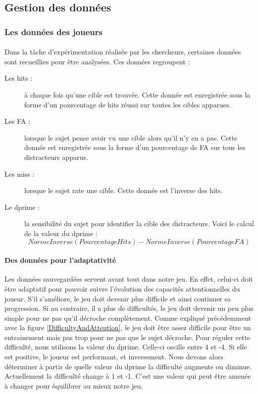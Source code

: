 \subsection{Gestion des données}
\label{Donnees}

\subsubsection{Les données des joueurs}

\paragraph{}Dans la tâche d'expérimentation réalisée par les chercheurs, certaines données sont recueillies pour être analysées. Ces données regroupent :
\begin{description}
\item[Les hits :] à chaque fois qu'une cible est trouvée. Cette donnée est enregistrée sous la forme d'un pourcentage de hits réussi sur toutes les cibles apparues.
\item[Les FA :] lorsque le sujet pense avoir vu une cible alors qu'il n'y en a pas. Cette donnée est enregistrée sous la forme d'un pourcentage de FA sur tous les distracteurs apparus.
\item[Les miss :] lorsque le sujet rate une cible. Cette donnée est l'inverse des hits.
\item[Le dprime :] la sensibilité du sujet pour identifier la cible des distracteurs. Voici le calcul de la valeur du dprime : \[NormeInverse(PourcentageHits) - NormeInverse(PourcentageFA)\]
\end{description}

\paragraph{Des données pour l'adaptativité}Les données sauvegardées servent avant tout dans notre jeu. En effet, celui-ci doit être adaptatif pour pouvoir suivre l'évolution des
capacités attentionnelles du joueur. S'il s'améliore, le jeu doit devenir plus difficile et ainsi continuer sa progression. Si au contraire, il a plus de difficultés, le jeu doit
devenir un peu plus simple pour ne pas qu'il décroche complètement. Comme expliqué précédemment avec la figure \ref{DifficultyAndAttention}, le jeu doit être assez difficile pour être
un entrainement mais pas trop pour ne pas que le sujet décroche. Pour réguler cette difficulté, nous utilisons la valeur du dprime. Celle-ci oscille entre 4 et -4. Si elle est positive,
le joueur est performant, et inversement. Nous devons alors déterminer à partir de quelle valeur du dprime la difficulté augmente ou diminue. Actuellement la difficulté change à 1 et
-1. C'est une valeur qui peut être amenée à changer pour équilibrer au mieux notre jeu.

